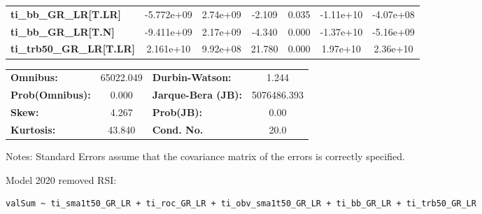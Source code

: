 \begin{center}
\begin{tabular}{lcccccc}
\textbf{ti\_bb\_GR\_LR[T.LR]}           &   -5.772e+09  &     2.74e+09     &    -2.109  &         0.035        &    -1.11e+10    &    -4.07e+08     \\
\textbf{ti\_bb\_GR\_LR[T.N]}            &   -9.411e+09  &     2.17e+09     &    -4.340  &         0.000        &    -1.37e+10    &    -5.16e+09     \\
\textbf{ti\_trb50\_GR\_LR[T.LR]}        &    2.161e+10  &     9.92e+08     &    21.780  &         0.000        &     1.97e+10    &     2.36e+10     \\
\bottomrule
\end{tabular}
\begin{tabular}{lclc}
\textbf{Omnibus:}       & 65022.049 & \textbf{  Durbin-Watson:     } &      1.244   \\
\textbf{Prob(Omnibus):} &    0.000  & \textbf{  Jarque-Bera (JB):  } & 5076486.393  \\
\textbf{Skew:}          &    4.267  & \textbf{  Prob(JB):          } &       0.00   \\
\textbf{Kurtosis:}      &   43.840  & \textbf{  Cond. No.          } &       20.0   \\
\bottomrule
\end{tabular}
\end{center}

Notes: \newline
 [1] Standard Errors assume that the covariance matrix of the errors is correctly specified.

Model 2020 removed RSI: \begin{verbatim}valSum ~ ti_sma1t50_GR_LR + ti_roc_GR_LR + ti_obv_sma1t50_GR_LR + ti_bb_GR_LR + ti_trb50_GR_LR\end{verbatim}

